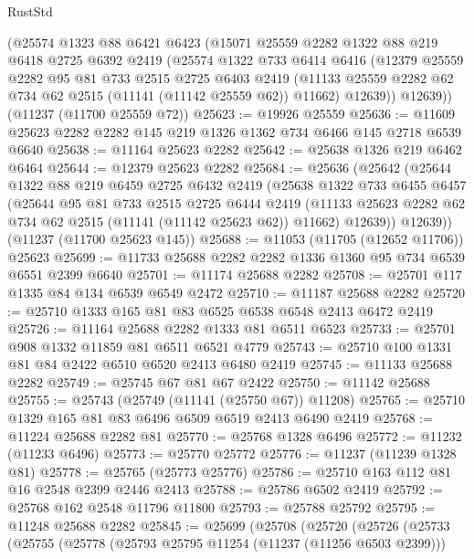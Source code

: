 \begin{lexlean}{RustStd}
\begin{coremodule}
    (@25574
      @1323
      @88
      @6421
      @6423
      (@15071
        @25559
        @2282
        @1322
        @88
        @219
        @6418
        @2725
        @6392
        @2419
        (@25574
          @1322
          @733
          @6414
          @6416
          (@12379
            @25559
            @2282
            @95
            @81
            @733
            @2515
            @2725
            @6403
            @2419
            (@11133 @25559 @2282 @62 @734 @62 @2515 (@11141 (@11142 @25559 @62)) @11662)
            @12639))
        @12639))
    (@11237 (@11700 @25559 @72))
@25623 := @19926 @25559
@25636 := @11609 @25623 @2282 @2282 @145 @219 @1326 @1362 @734 @6466 @145 @2718 @6539 @6640
@25638 := @11164 @25623 @2282
@25642 := @25638 @1326 @219 @6462 @6464
@25644 := @12379 @25623 @2282
@25684 := @25636
    (@25642
      (@25644
        @1322
        @88
        @219
        @6459
        @2725
        @6432
        @2419
        (@25638
          @1322
          @733
          @6455
          @6457
          (@25644
            @95
            @81
            @733
            @2515
            @2725
            @6444
            @2419
            (@11133 @25623 @2282 @62 @734 @62 @2515 (@11141 (@11142 @25623 @62)) @11662)
            @12639))
        @12639))
    (@11237 (@11700 @25623 @145))
@25688 := @11053 (@11705 (@12652 @11706)) @25623
@25699 := @11733 @25688 @2282 @2282 @1336 @1360 @95 @734 @6539 @6551 @2399 @6640
@25701 := @11174 @25688 @2282
@25708 := @25701 @117 @1335 @84 @134 @6539 @6549 @2472
@25710 := @11187 @25688 @2282
@25720 := @25710 @1333 @165 @81 @83 @6525 @6538 @6548 @2413 @6472 @2419
@25726 := @11164 @25688 @2282 @1333 @81 @6511 @6523
@25733 := @25701 @908 @1332 @11859 @81 @6511 @6521 @4779
@25743 := @25710 @100 @1331 @81 @84 @2422 @6510 @6520 @2413 @6480 @2419
@25745 := @11133 @25688 @2282
@25749 := @25745 @67 @81 @67 @2422
@25750 := @11142 @25688
@25755 := @25743 (@25749 (@11141 (@25750 @67)) @11208)
@25765 := @25710 @1329 @165 @81 @83 @6496 @6509 @6519 @2413 @6490 @2419
@25768 := @11224 @25688 @2282 @81
@25770 := @25768 @1328 @6496
@25772 := @11232 (@11233 @6496)
@25773 := @25770 @25772
@25776 := @11237 (@11239 @1328 @81)
@25778 := @25765 (@25773 @25776)
@25786 := @25710 @163 @112 @81 @16 @2548 @2399 @2446 @2413
@25788 := @25786 @6502 @2419
@25792 := @25768 @162 @2548 @11796 @11800
@25793 := @25788 @25792
@25795 := @11248 @25688 @2282
@25845 := @25699
    (@25708
      (@25720
        (@25726
          (@25733
            (@25755
              (@25778
                (@25793 @25795 @11254 (@11237 (@11256 @6503 @2399)))

\end{coremodule}
\end{lexlean}
